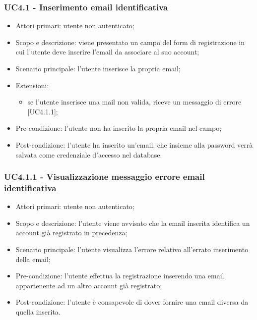 \subsubsection{UC4.1 - Inserimento email identificativa}
\begin{itemize}
	\item  Attori primari: utente non autenticato;
	\item  Scopo e descrizione: viene presentato un campo del form di registrazione in cui l'utente deve inserire l'email da associare al suo account;
	\item  Scenario principale: l'utente inserisce la propria email;	
	\item  Estensioni:
		   \begin{itemize}
				\item se l'utente inserisce una mail non valida, riceve un messaggio di errore [UC4.1.1];
		   \end{itemize}
	\item  Pre-condizione: l'utente non ha inserito la propria email nel campo;
	\item  Post-condizione: l'utente ha inserito un'email, che insieme alla password verrà salvata come credenziale d'accesso nel database.
\end{itemize}
\subsubsection{UC4.1.1 - Visualizzazione messaggio errore email identificativa}
\begin{itemize}
	\item  Attori primari: utente non autenticato;
	\item  Scopo e descrizione: l'utente viene avvisato che la email inserita identifica un account già registrato in precedenza;
	\item  Scenario principale: l'utente visualizza l'errore relativo all'errato inserimento della email;
	\item  Pre-condizione: l'utente effettua la registrazione inserendo una email appartenente ad un altro account già registrato;
	\item  Post-condizione: l'utente è consapevole di dover fornire una email diversa da quella inserita.
\end{itemize}
